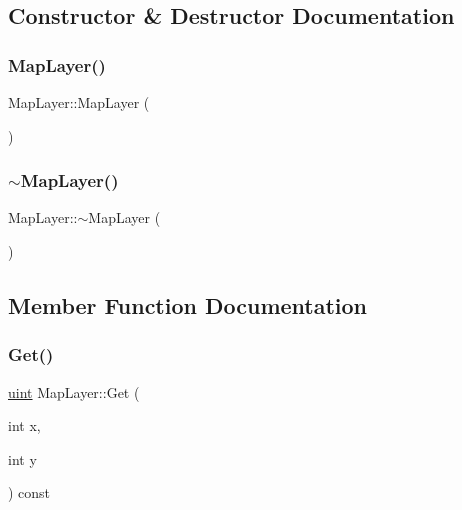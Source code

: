 \subsection{Constructor \& Destructor Documentation}
\mbox{\label{struct_map_layer_ac2dab51bb0671c762fc9e4b8531f4931}} 
\subsubsection{\texorpdfstring{MapLayer()}{MapLayer()}}
{\footnotesize\ttfamily Map\+Layer\+::\+Map\+Layer (\begin{DoxyParamCaption}{ }\end{DoxyParamCaption})\hspace{0.3cm}{\ttfamily [inline]}}

\mbox{\label{struct_map_layer_a94609aba07cd4a3afb940d6256e3f366}} 
\subsubsection{\texorpdfstring{$\sim$MapLayer()}{~MapLayer()}}
{\footnotesize\ttfamily Map\+Layer\+::$\sim$\+Map\+Layer (\begin{DoxyParamCaption}{ }\end{DoxyParamCaption})\hspace{0.3cm}{\ttfamily [inline]}}



\subsection{Member Function Documentation}
\mbox{\label{struct_map_layer_ad4752612f0af4b42b1fdca9f3a1fda91}} 
\subsubsection{\texorpdfstring{Get()}{Get()}}
{\footnotesize\ttfamily \mbox{\hyperlink{_defs_8h_a91ad9478d81a7aaf2593e8d9c3d06a14}{uint}} Map\+Layer\+::\+Get (\begin{DoxyParamCaption}\item[{int}]{x,  }\item[{int}]{y }\end{DoxyParamCaption}) const\hspace{0.3cm}{\ttfamily [inline]}}



